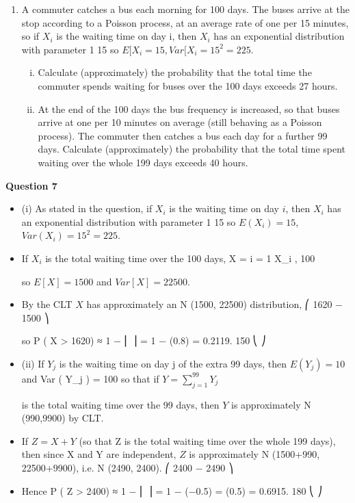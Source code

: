 \documentclass[a4paper,12pt]{article}
\begin{document}
\begin{enumerate}

\item 
A commuter catches a bus each morning for 100 days. The buses arrive at the stop
according to a Poisson process, at an average rate of one per 15 minutes, so if $X_{i}$ is the
waiting time on day i, then $X_{i}$ has an exponential distribution with parameter
1
15
so
$E[X_{i}  = 15, Var[X_{i} = 15^2 = 225.$

\begin{enumerate}[(i)]
\item Calculate (approximately) the probability that the total time the commuter spends waiting for buses over the 100 days exceeds 27 hours.

\item  At the end of the 100 days the bus frequency is increased, so that buses arrive at one per 10 minutes on average (still behaving as a Poisson process). The commuter then catches a bus each day for a further 99 days. Calculate
(approximately) the probability that the total time spent waiting over the
whole 199 days exceeds 40 hours.
\end{enumerate}

\end{enumerate}
\newpage


\noindent \textbf{Question 7}
\begin{itemize}
\item (i)
As stated in the question, if $X_{i}$ is the waiting time on day $i$, then $X_{i}$ has an exponential distribution with parameter
1
15
so $E(X_{i} ) = 15$, $Var(X_{i} ) = 15^2 = 225$.
\item If $X_{i}$ is the total waiting time over the 100 days, X = \sum i = 1 X_{i} ,
100


so $E [ X ] = 1500$ and $Var [ X ] = 22500$. 
\item  By the CLT $X$ has approximately an N (1500, 22500) distribution,
⎛ 1620 − 1500 ⎞

so P ( X > 1620) ≈ 1 − \Phi ⎜
⎟ = 1 − \Phi(0.8) = 0.2119.
150
⎝
⎠
\item (ii)
If $Y_j$ is the waiting time on day j of the extra 99 days, then $E ( Y_j ) = 10$ and
Var ( Y_j ) = 100 so that if $Y =
\sum^{99}_{j = 1} Y_j$

is the total waiting time over the 99 days,
then $Y$ is approximately N (990,9900) by CLT.
\item If $Z = X + Y$ (so that Z is the total waiting time over the whole 199 days), then
since X and Y are independent, $Z$ is approximately N (1500+990, 22500+9900),
i.e. N (2490, 2400).
⎛ 2400 − 2490 ⎞
\item Hence P ( Z > 2400) ≈ 1 − \Phi ⎜
⎟ = 1 − \Phi(−0.5) = \Phi(0.5) = 0.6915.
180
⎝
⎠
\end{itemize}
\end{document}
